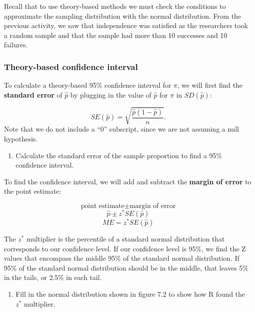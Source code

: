 \documentclass[
]{report}
\providecommand{\tightlist}{%
  \setlength{\itemsep}{0pt}\setlength{\parskip}{0pt}}
\begin{document}
Recall that to use theory-based methods we must check the conditions to approximate the sampling distribution with the normal distribution. From the previous activity, we saw that independence was satisfied as the researchers took a random sample and that the sample had more than 10 successes and 10 failures.

\newpage

\hypertarget{theory-based-confidence-interval}{%
\subsubsection*{Theory-based confidence interval}\label{theory-based-confidence-interval}}

To calculate a theory-based 95\% confidence interval for \(\pi\), we will first find the \textbf{standard error} of \(\hat{p}\) by plugging in the value of \(\hat{p}\) for \(\pi\) in \(SD(\hat{p})\):

\[SE(\hat{p}) = \sqrt{\frac{\hat{p}(1-\hat{p})}{n}}.\]
Note that we do not include a ``0'' subscript, since we are not assuming a null hypothesis.

\begin{enumerate}
\def\labelenumi{\arabic{enumi}.}
\tightlist
\item
  Calculate the standard error of the sample proportion to find a 95\% confidence interval.
\end{enumerate}

\vspace{0.5in}

To find the confidence interval, we will add and subtract the \textbf{margin of error} to the point estimate:

\[\text{point estimate}\pm\text{margin of error}\]
\[\hat{p}\pm z^* SE(\hat{p})\]
\[ME = z^* SE(\hat{p})\]

The \(z^*\) multiplier is the percentile of a standard normal distribution that corresponds to our confidence level. If our confidence level is 95\%, we find the Z values that encompass the middle 95\% of the standard normal distribution. If 95\% of the standard normal distribution should be in the middle, that leaves 5\% in the tails, or 2.5\% in each tail.

\begin{enumerate}
\def\labelenumi{\arabic{enumi}.}
\setcounter{enumi}{1}
\tightlist
\item
  Fill in the normal distribution shown in figure 7.2 to show how R found the \(z^*\) multiplier.
\end{enumerate}
\end{document}
